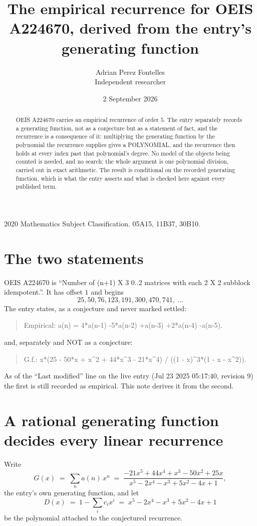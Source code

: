 \documentclass[11pt,a4paper]{article}
\title{The empirical recurrence for OEIS A224670, derived from the entry's generating function}
\author{Adrian Perez Fontelles\\ \small Independent researcher}
\date{2 September 2026}
\theoremstyle{plain}
\theoremstyle{definition}
\begin{document}
\maketitle

\begin{abstract}
OEIS A224670 carries an empirical recurrence of order $5$. The entry separately records a
generating function, not as a conjecture but as a statement of fact, and the recurrence is a
consequence of it: multiplying the generating function by the polynomial the recurrence
supplies gives a POLYNOMIAL, and the recurrence then holds at every index past that
polynomial's degree. No model of the objects being counted is needed, and no search: the
whole argument is one polynomial division, carried out in exact arithmetic. The result is
conditional on the recorded generating function, which is what the entry asserts and what is
checked here against every published term.
\end{abstract}

\noindent\small 2020 Mathematics Subject Classification. 05A15, 11B37, 30B10.\normalsize

\section{The two statements}

OEIS A224670 is ``Number of (n+1) X 3 0..2 matrices with each 2 X 2 subblock idempotent.''. It has offset $1$ and begins
\[
25, 50, 76, 123, 191, 300, 470, 741,\ \dots
\]
The entry states, as a conjecture and never marked settled:
\begin{quote}
Empirical: a(n) = 4*a(n-1) -5*a(n-2) +a(n-3) +2*a(n-4) -a(n-5).
\end{quote}
and, separately and NOT as a conjecture:
\begin{quote}
G.f.: x*(25 - 50*x + x\^{}2 + 44*x\^{}3 - 21*x\^{}4) / ((1 - x)\^{}3*(1 - x - x\^{}2)).
\end{quote}
As of the ``Last modified'' line on the live entry (Jul 23 2025 05:17:40, revision 9) the first is still
recorded as empirical. This note derives it from the second.

\section{A rational generating function decides every linear recurrence}

Write
\[
G(x)\;=\;\sum_{n}a(n)\,x^{n}\;=\;\frac{- 21 x^{5} + 44 x^{4} + x^{3} - 50 x^{2} + 25 x}{x^{5} - 2 x^{4} - x^{3} + 5 x^{2} - 4 x + 1},
\]
the entry's own generating function, and let
\[
D(x)\;=\;1-\sum_i c_i x^{i}\;=\;x^{5} - 2 x^{4} - x^{3} + 5 x^{2} - 4 x + 1
\]
be the polynomial attached to the conjectured recurrence.
\end{document}
